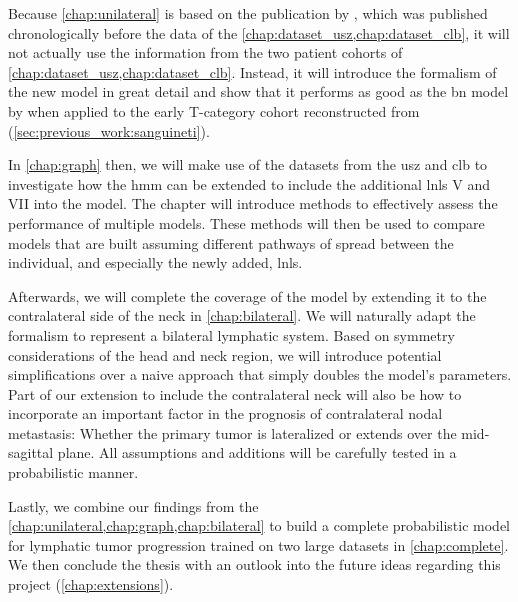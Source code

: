 \documentclass[\relativeRoot/main.tex]{subfiles}
\begin{document}
Because \cref{chap:unilateral} is based on the publication by , which was published chronologically before the data of the \cref{chap:dataset_usz,chap:dataset_clb}, it will not actually use the information from the two patient cohorts of \cref{chap:dataset_usz,chap:dataset_clb}. Instead, it will introduce the formalism of the new model in great detail and show that it performs as good as the \gls{bn} model by  when applied to the early T-category cohort reconstructed from  (\cref{sec:previous_work:sanguineti}).

In \cref{chap:graph} then, we will make use of the datasets from the \gls{usz} and \gls{clb} to investigate how the \gls{hmm} can be extended to include the additional \glspl{lnl} V and VII into the model. The chapter will introduce methods to effectively assess the performance of multiple models. These methods will then be used to compare models that are built assuming different pathways of spread between the individual, and especially the newly added, \glspl{lnl}.

Afterwards, we will complete the coverage of the model by extending it to the contralateral side of the neck in \cref{chap:bilateral}. We will naturally adapt the formalism to represent a bilateral lymphatic system. Based on symmetry considerations of the head and neck region, we will introduce potential simplifications over a naive approach that simply doubles the model's parameters. Part of our extension to include the contralateral neck will also be how to incorporate an important factor in the prognosis of contralateral nodal metastasis: Whether the primary tumor is lateralized or extends over the mid-sagittal plane. All assumptions and additions will be carefully tested in a probabilistic manner.

Lastly, we combine our findings from the \cref{chap:unilateral,chap:graph,chap:bilateral} to build a complete probabilistic model for lymphatic tumor progression trained on two large datasets in \cref{chap:complete}. We then conclude the thesis with an outlook into the future ideas regarding this project (\cref{chap:extensions}).
\end{document}

